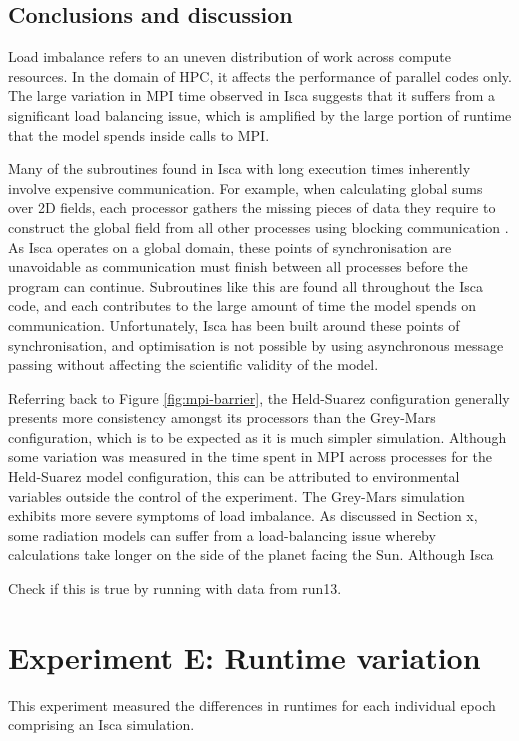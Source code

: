 \documentclass[a4paper,11pt]{report}
\begin{document}
\subsection{Conclusions and discussion}
Load imbalance refers to an uneven distribution of work across compute resources. In the domain of HPC, it affects the performance of parallel codes only. The large variation in MPI time observed in Isca suggests that it suffers from a significant load balancing issue, which is amplified by the large portion of runtime that the model spends inside calls to MPI.
\par
Many of the subroutines found in Isca with long execution times inherently involve expensive communication. For example, when calculating global sums over 2D fields, each processor gathers the missing pieces of data they require to construct the global field from all other processes using blocking communication \cite{schmidt2007benchmark}. As Isca operates on a global domain, these points of synchronisation are unavoidable as communication must finish between all processes before the program can continue. Subroutines like this are found all throughout the Isca code, and each contributes to the large amount of time the model spends on communication. Unfortunately, Isca has been built around these points of synchronisation, and optimisation is not possible by using asynchronous message passing without affecting the scientific validity of the model. 
\par
Referring back to Figure \ref{fig:mpi-barrier}, the Held-Suarez configuration generally presents more consistency amongst its processors than the Grey-Mars configuration, which is to be expected as it is much simpler simulation. Although some variation was measured in the time spent in MPI across processes for the Held-Suarez model configuration, this can be attributed to environmental variables outside the control of the experiment. The Grey-Mars simulation exhibits more severe symptoms of load imbalance. As discussed in Section x, some radiation models can suffer from a load-balancing issue whereby calculations take longer on the side of the planet facing the Sun. Although Isca 

\par
Check if this is true by running with data from run13. 

\section{Experiment E: Runtime variation}
This experiment measured the differences in runtimes for each individual epoch comprising an Isca simulation.
\end{document}
